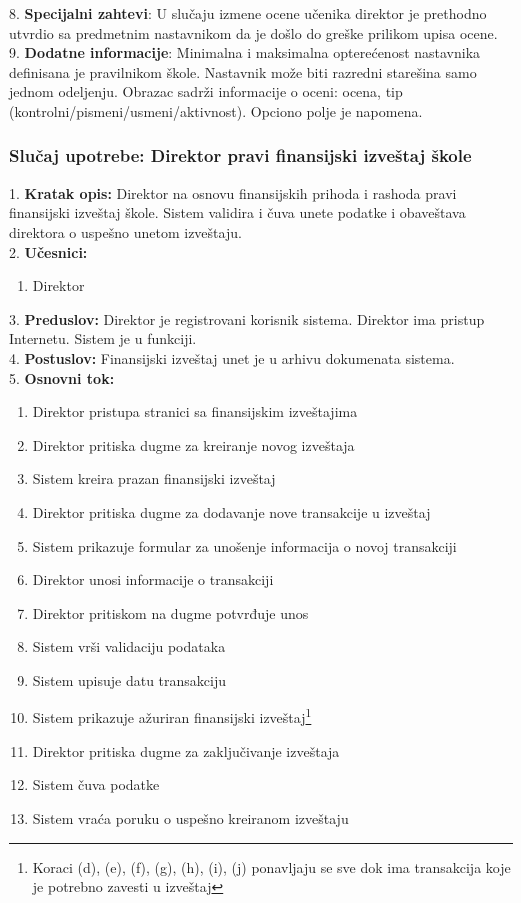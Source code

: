 \documentclass{article}
\begin{document}
8. \textbf{Specijalni zahtevi}: U slučaju izmene ocene učenika direktor je prethodno utvrdio sa predmetnim nastavnikom da je došlo do greške prilikom upisa ocene. \\

9. \textbf{Dodatne informacije}: Minimalna i maksimalna opterećenost nastavnika definisana je pravilnikom škole. Nastavnik može biti razredni starešina samo jednom odeljenju. Obrazac sadrži informacije o oceni: ocena, tip (kontrolni/pismeni/usmeni/aktivnost). Opciono polje je napomena. \\


\subsubsection{Slučaj upotrebe: Direktor pravi finansijski izveštaj škole}
1. \textbf{Kratak opis:} Direktor na osnovu finansijskih prihoda i rashoda pravi finansijski izveštaj škole. Sistem validira i čuva unete podatke i obaveštava direktora o uspešno unetom izveštaju. \\

2. \textbf{Učesnici:}
\begin{enumerate} [label=(\alph*)]
\item Direktor
\end{enumerate} 

3. \textbf{Preduslov:} Direktor je registrovani korisnik sistema. Direktor ima pristup Internetu. Sistem je u funkciji. \\

4. \textbf{Postuslov:} Finansijski izveštaj unet je u arhivu dokumenata sistema. \\

5. \textbf{Osnovni tok:} 
\begin{enumerate} [label=(\alph*)]
\item Direktor pristupa stranici sa finansijskim izveštajima
\item Direktor pritiska dugme za kreiranje novog izveštaja
\item Sistem kreira prazan finansijski izveštaj
\item Direktor pritiska dugme za dodavanje nove transakcije u izveštaj
\item Sistem prikazuje formular za unošenje informacija o novoj transakciji
\item Direktor unosi informacije o transakciji
\item Direktor pritiskom na dugme potvrđuje unos
\item Sistem vrši validaciju podataka
\item Sistem upisuje datu transakciju
\item Sistem prikazuje ažuriran finansijski izveštaj\footnote{Koraci (d), (e), (f), (g), (h), (i), (j) ponavljaju se sve dok ima transakcija koje je potrebno zavesti u izveštaj}
\item Direktor pritiska dugme za zaključivanje izveštaja
\item Sistem čuva podatke
\item Sistem vraća poruku o uspešno kreiranom izveštaju

\end{enumerate}
\end{document}

